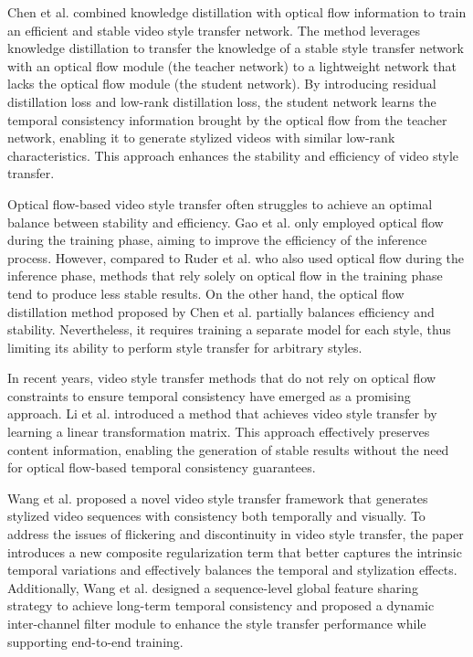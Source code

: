 \documentclass[preprint,12pt]{elsarticle}
\begin{document}
Chen et al.\citep{100chen2020optical} combined knowledge distillation with optical flow information to train an efficient and stable video style transfer network. The method leverages knowledge distillation to transfer the knowledge of a stable style transfer network with an optical flow module (the teacher network) to a lightweight network that lacks the optical flow module (the student network). By introducing residual distillation loss and low-rank distillation loss, the student network learns the temporal consistency information brought by the optical flow from the teacher network, enabling it to generate stylized videos with similar low-rank characteristics. This approach enhances the stability and efficiency of video style transfer.

Optical flow-based video style transfer often struggles to achieve an optimal balance between stability and efficiency. Gao et al.\citep{99gao2019reconet} only employed optical flow during the training phase, aiming to improve the efficiency of the inference process. However, compared to Ruder et al.\citep{98ruder2016artistic}  who also used optical flow during the inference phase, methods that rely solely on optical flow in the training phase tend to produce less stable results. On the other hand, the optical flow distillation method proposed by Chen et al.\citep{100chen2020optical} partially balances efficiency and stability. Nevertheless, it requires training a separate model for each style, thus limiting its ability to perform style transfer for arbitrary styles.

In recent years, video style transfer methods that do not rely on optical flow constraints to ensure temporal consistency have emerged as a promising approach. Li et al.\citep{101li2019learning} introduced a method that achieves video style transfer by learning a linear transformation matrix. This approach effectively preserves content information, enabling the generation of stable results without the need for optical flow-based temporal consistency guarantees.

Wang et al.\citep{102wang2020consistent} proposed a novel video style transfer framework that generates stylized video sequences with consistency both temporally and visually. To address the issues of flickering and discontinuity in video style transfer, the paper introduces a new composite regularization term that better captures the intrinsic temporal variations and effectively balances the temporal and stylization effects. Additionally, Wang et al. designed a sequence-level global feature sharing strategy to achieve long-term temporal consistency and proposed a dynamic inter-channel filter module to enhance the style transfer performance while supporting end-to-end training.
\end{document}
